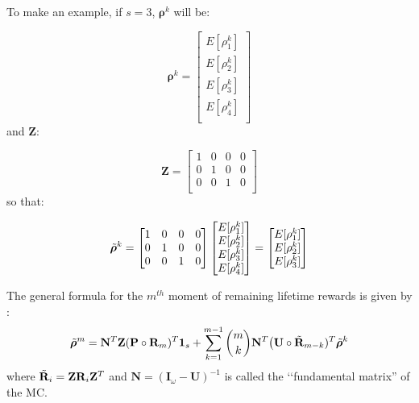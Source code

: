 \documentclass[\main/main.tex]{subfiles}
\begin{document}
\noindent To make an example, if $s = 3$,  $\bm{\rho}^k$ will be:

\begin{equation}
\bm{\rho}^k =
\begin{bmatrix}
E[\rho^k_1]\\
E[\rho^k_2]\\
E[\rho^k_{3}]\\
E[\rho^k_{4}]\\
\end{bmatrix}
\end{equation}
and $\mathbf{Z}$:

\begin{equation}
\mathbf{Z}=
    \begin{bmatrix}
   1 & 0 & 0 & 0\\
    0 & 1 & 0 & 0\\
     0 & 0 & 1 & 0\\
    \end{bmatrix}
\end{equation}
so that:

\begin{equation}
\Tilde{\bm{\rho}}^k =
    \begin{bmatrix}
   1 & 0 & 0 & 0\\
    0 & 1 & 0 & 0\\
     0 & 0 & 1 & 0\\
    \end{bmatrix}
    \begin{bmatrix}
E[\rho^k_1]\\
E[\rho^k_2]\\
E[\rho^k_{3}]\\
E[\rho^k_{4}]\\
\end{bmatrix} = 
\begin{bmatrix}
E[\rho^k_1]\\
E[\rho^k_2]\\
E[\rho^k_{3}]\\
\end{bmatrix}
\end{equation}

The general formula for the $m^{th}$ moment of remaining lifetime rewards is given by \citep{Caswell2018}:
\begin{equation}
    \Tilde{\bm{\rho}}^m = \mathbf{N}^T \mathbf{Z} (\mathbf{P} \circ \mathbf{R}_m)^T \bm{1}_s + \sum_{k=1}^{m-1} \binom{m}{k} \mathbf{N}^T \big( \mathbf{U} \circ \Tilde{\mathbf{R}}_{m-k})^T  \Tilde{\bm{\rho}}^k 
\end{equation}
where $\Tilde{\mathbf{R}}_i = \mathbf{Z}\mathbf{R}_i\mathbf{Z}^T$ and $\mathbf{N} = (\mathbf{I}_\omega - \mathbf{U})^{-1}$ is called the \lq\lq fundamental matrix'' of the MC.\\
\end{document}
